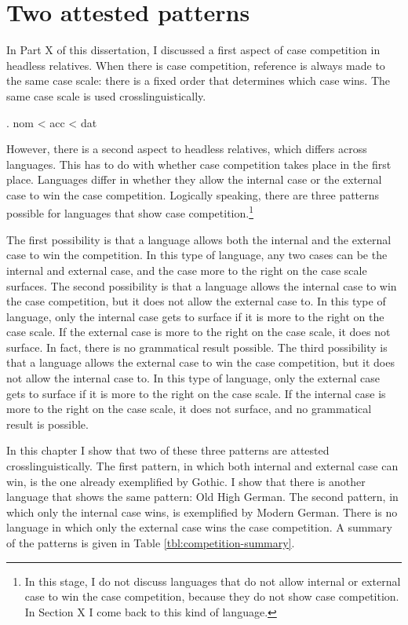 
\chapter{Two attested patterns}

In Part X of this dissertation, I discussed a first aspect of case competition in headless relatives. When there is case competition, reference is always made to the same case scale: there is a fixed order that determines which case wins. The same case scale is used crosslinguistically.

\ex. \ac{nom} < \ac{acc} < \ac{dat}\label{ex:case-scale-two-patterns}

However, there is a second aspect to headless relatives, which differs across languages. This has to do with whether case competition takes place in the first place. Languages differ in whether they allow the internal case or the external case to win the case competition. Logically speaking, there are three patterns possible for languages that show case competition.\footnote{
In this stage, I do not discuss languages that do not allow internal or external case to win the case competition, because they do not show case competition. In Section X I come back to this kind of language.
}

The first possibility is that a language allows both the internal and the external case to win the competition. In this type of language, any two cases can be the internal and external case, and the case more to the right on the case scale surfaces.
The second possibility is that a language allows the internal case to win the case competition, but it does not allow the external case to. In this type of language, only the internal case gets to surface if it is more to the right on the case scale. If the external case is more to the right on the case scale, it does not surface. In fact, there is no grammatical result possible.
The third possibility is that a language allows the external case to win the case competition, but it does not allow the internal case to. In this type of language, only the external case gets to surface if it is more to the right on the case scale. If the internal case is more to the right on the case scale, it does not surface, and no grammatical result is possible.

In this chapter I show that two of these three patterns are attested crosslinguistically. The first pattern, in which both internal and external case can win, is the one already exemplified by Gothic. I show that there is another language that shows the same pattern: Old High German. The second pattern, in which only the internal case wins, is exemplified by Modern German. There is no language in which only the external case wins the case competition. A summary of the patterns is given in Table \ref{tbl:competition-summary}.

